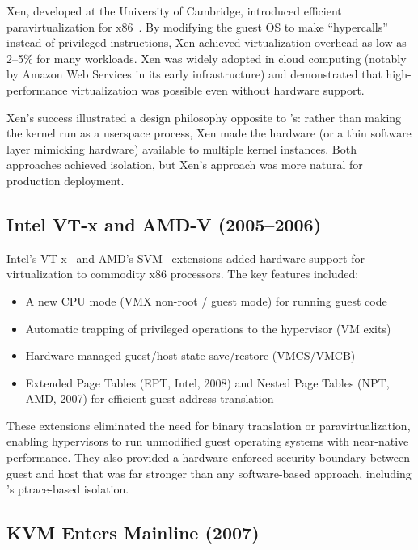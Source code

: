 Xen, developed at the University of Cambridge, introduced efficient
paravirtualization for x86~\cite{barham2003}.  By modifying the guest OS to
make ``hypercalls'' instead of privileged instructions, Xen achieved
virtualization overhead as low as 2--5\% for many workloads.  Xen was widely
adopted in cloud computing (notably by Amazon Web Services in its early
infrastructure) and demonstrated that high-performance virtualization was
possible even without hardware support.

Xen's success illustrated a design philosophy opposite to \UML{}'s: rather
than making the kernel run as a userspace process, Xen made the hardware (or
a thin software layer mimicking hardware) available to multiple kernel
instances.  Both approaches achieved isolation, but Xen's approach was more
natural for production deployment.

\subsection{Intel VT-x and AMD-V (2005--2006)}
\label{sec:history-hwext}

Intel's VT-x~\cite{intel-vt} and AMD's SVM~\cite{amd-svm} extensions added
hardware support for virtualization to commodity x86 processors.  The key
features included:

\begin{itemize}[nosep]
  \item A new CPU mode (VMX non-root / guest mode) for running guest code
  \item Automatic trapping of privileged operations to the hypervisor
    (VM exits)
  \item Hardware-managed guest/host state save/restore (VMCS/VMCB)
  \item Extended Page Tables (EPT, Intel, 2008) and Nested Page Tables
    (NPT, AMD, 2007) for efficient guest address translation
\end{itemize}

\noindent
These extensions eliminated the need for binary translation or
paravirtualization, enabling hypervisors to run unmodified guest operating
systems with near-native performance.  They also provided a hardware-enforced
security boundary between guest and host that was far stronger than any
software-based approach, including \UML{}'s ptrace-based isolation.

\subsection{KVM Enters Mainline (2007)}
\label{sec:history-kvm-merge}

